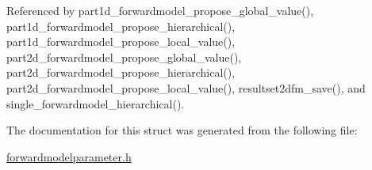 Referenced by part1d\+\_\+forwardmodel\+\_\+propose\+\_\+global\+\_\+value(), part1d\+\_\+forwardmodel\+\_\+propose\+\_\+hierarchical(), part1d\+\_\+forwardmodel\+\_\+propose\+\_\+local\+\_\+value(), part2d\+\_\+forwardmodel\+\_\+propose\+\_\+global\+\_\+value(), part2d\+\_\+forwardmodel\+\_\+propose\+\_\+hierarchical(), part2d\+\_\+forwardmodel\+\_\+propose\+\_\+local\+\_\+value(), resultset2dfm\+\_\+save(), and single\+\_\+forwardmodel\+\_\+hierarchical().



The documentation for this struct was generated from the following file\+:\begin{DoxyCompactItemize}
\item 
\hyperlink{forwardmodelparameter_8h}{forwardmodelparameter.\+h}\end{DoxyCompactItemize}
